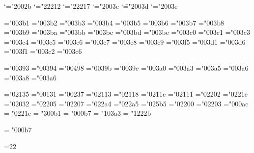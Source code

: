 \mathcode`\+="2002b
\mathcode`\-="22212
\mathcode`\*="22217
\mathcode`\<="2003c
\mathcode`\=="2003d
\mathcode`\>="2003e

\mathchardef\alpha="003b1
\mathchardef\beta="003b2
\mathchardef\gamma="003b3
\mathchardef\delta="003b4
\mathchardef\epsilon="003b5
\mathchardef\zeta="003b6
\mathchardef\eta="003b7
\mathchardef\theta="003b8
\mathchardef\iota="003b9
\mathchardef\kappa="003ba
\mathchardef\lambda="003bb
\mathchardef\mu="003bc
\mathchardef\nu="003bd
\mathchardef\xi="003be
\mathchardef\pi="003c0
\mathchardef\rho="003c1
\mathchardef\sigma="003c3
\mathchardef\tau="003c4
\mathchardef\upsilon="003c5
\mathchardef\phi="003c6
\mathchardef\chi="003c7
\mathchardef\psi="003c8
\mathchardef\omega="003c9
\mathchardef\varepsilon="003f5
\mathchardef\vartheta="003d1
\mathchardef\varpi="003d6
\mathchardef\varrho="003f1
\mathchardef\varsigma="003c2
\mathchardef\varphi="003c6

\mathchardef\Gamma="00393
\mathchardef\Delta="00394
\mathchardef\Theta="00498
\mathchardef\Lambda="0039b
\mathchardef\Xi="0039e
\mathchardef\Pi="003a0
\mathchardef\Sigma="003a3
\mathchardef\Upsilon="003a5
\mathchardef\Phi="003a6
\mathchardef\Psi="003a8
\mathchardef\Omega="003a6

\mathchardef\aleph="02135
\mathchardef\imath="00131
\mathchardef\jmath="00237
\mathchardef\ell="02113
\mathchardef\wp="02118
\mathchardef\Re="0211c
\mathchardef\Im="02111
\mathchardef\partial="02202
\mathchardef\infty="0221e
\mathchardef\prime="02032
\mathchardef\emptyset="02205
\mathchardef\nabla="02207
\mathchardef\top="022a4
\mathchardef\bot="022a5
\mathchardef\triangle="025b5
\mathchardef\forall="02200
\mathchardef\exists="02203
\mathchardef\neg="000ac \let\lnot=\neg
\mathchardef\infty = "0221e
\mathchardef\plusminus = "300b1
\mathchardef\cdotp = "000b7
\mathchardef\sum   = "103a3
\mathchardef\intop = "1222b

\def\int{\intop\nolimits}
\def\sqrt{\radical"2221a}
\mathchardef\cdotp = "000b7
\def\cdots{%
  \mathinner{\cdotp\cdotp\cdotp}}

=22
\countdef{}\countdef{}
\def\newcount{\alloc0\count\countdef\inscount}
\def\alloc#1#2#3#4#5{\global\advance\count1#1 by1
  \allocationnumber=\count1#1
  \global#3#5=\allocationnumber}
